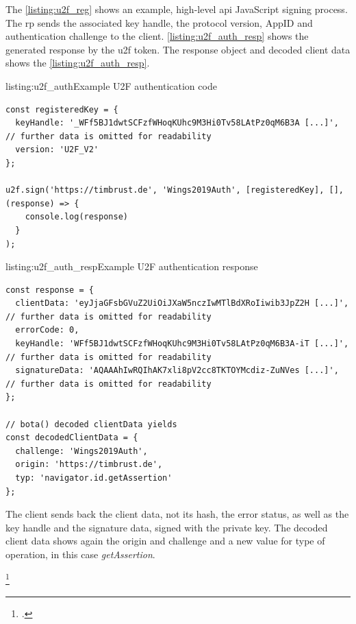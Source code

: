 The \autoref{listing:u2f_reg} shows an example, high-level \gls{api} JavaScript signing process. The \gls{rp} sends the associated key handle, the protocol version, AppID and authentication challenge to the client. \autoref{listing:u2f_auth_resp} shows the generated response by the \gls{u2f} token. The response object and decoded client data shows the \autoref{listing:u2f_auth_resp}.
\\
\begin{example}{listing:u2f_auth}{Example U2F authentication code}
\begin{verbatim}
const registeredKey = {
  keyHandle: '_WFf5BJ1dwtSCFzfWHoqKUhc9M3Hi0Tv58LAtPz0qM6B3A [...]', // further data is omitted for readability
  version: 'U2F_V2'
};

u2f.sign('https://timbrust.de', 'Wings2019Auth', [registeredKey], [], (response) => {
    console.log(response)
  }
);
\end{verbatim}
\end{example}

\begin{example}{listing:u2f_auth_resp}{Example U2F authentication response}
\begin{verbatim}
const response = {
  clientData: 'eyJjaGFsbGVuZ2UiOiJXaW5nczIwMTlBdXRoIiwib3JpZ2H [...]', // further data is omitted for readability
  errorCode: 0,
  keyHandle: 'WFf5BJ1dwtSCFzfWHoqKUhc9M3Hi0Tv58LAtPz0qM6B3A-iT [...]', // further data is omitted for readability
  signatureData: 'AQAAAhIwRQIhAK7xli8pV2cc8TKTOYMcdiz-ZuNVes [...]', // further data is omitted for readability
};

// bota() decoded clientData yields
const decodedClientData = {
  challenge: 'Wings2019Auth',
  origin: 'https://timbrust.de',
  typ: 'navigator.id.getAssertion'
};
\end{verbatim}
\end{example}

The client sends back the client data, not its hash, the error status, as well as the key handle and the signature data, signed with the private key. The decoded client data shows again the origin and challenge and a new value for type of operation, in this case \textit{getAssertion}.

\footcites[See][1--2, 4]{u2f-overview}[See][4]{u2f-js-api}